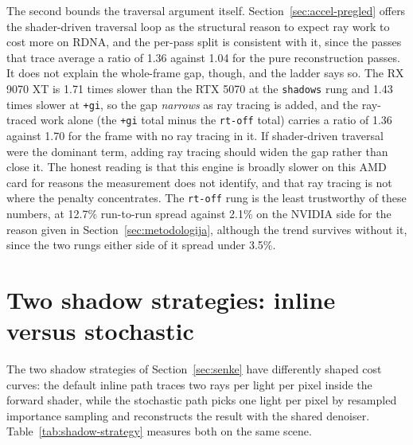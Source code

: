 The second bounds the traversal argument itself. Section~\ref{sec:accel-pregled} offers the
shader-driven traversal loop as the structural reason to expect ray work to cost more on RDNA, and
the per-pass split is consistent with it, since the passes that trace average a ratio of 1.36 against
1.04 for the pure reconstruction passes. It does not explain the whole-frame gap, though, and the
ladder says so. The RX 9070 XT is 1.71 times slower than the RTX 5070 at the \texttt{shadows} rung
and 1.43 times slower at \texttt{+gi}, so the gap \emph{narrows} as ray tracing is added, and the
ray-traced work alone (the \texttt{+gi} total minus the \texttt{rt-off} total) carries a ratio of
1.36 against 1.70 for the frame with no ray tracing in it. If shader-driven traversal were the
dominant term, adding ray tracing should widen the gap rather than close it. The honest reading is
that this engine is broadly slower on this AMD card for reasons the measurement does not identify,
and that ray tracing is not where the penalty concentrates. The \texttt{rt-off} rung is the least
trustworthy of these numbers, at 12.7\% run-to-run spread against 2.1\% on the NVIDIA side for the
reason given in Section~\ref{sec:metodologija}, although the trend survives without it, since the two
rungs either side of it spread under 3.5\%.

\section{Two shadow strategies: inline versus stochastic}
\label{sec:analiza-shadow-strategy}

The two shadow strategies of Section~\ref{sec:senke} have differently shaped cost curves: the default
inline path traces two rays per light per pixel inside the forward shader, while the stochastic path
picks one light per pixel by resampled importance sampling and reconstructs the result with the
shared denoiser. Table~\ref{tab:shadow-strategy} measures both on the same scene.

\begin{table}[tbp]
\caption[Inline versus stochastic shadow cost]{Two shadow strategies on the same scene with five enabled lights (GPU ms, delta over
\texttt{rt-off}).}
\label{tab:shadow-strategy}
\centering

\end{table}

